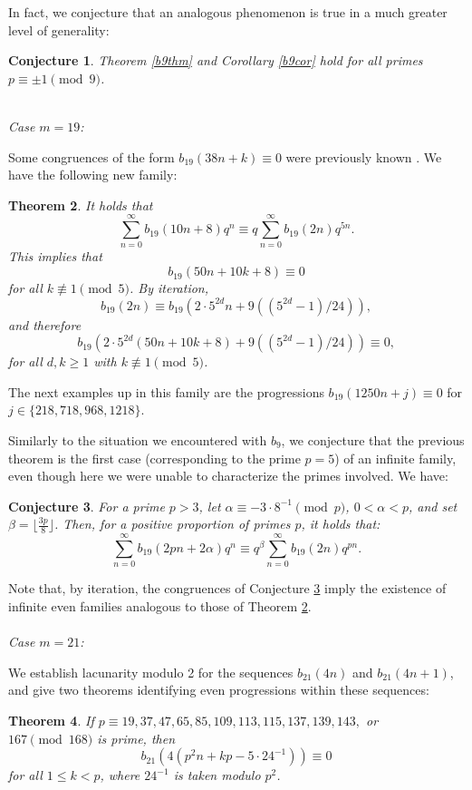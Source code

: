 \documentclass[12pt]{amsart}
\newtheorem{theorem}{Theorem}%
\newtheorem{conjecture}[theorem]{Conjecture}
\theoremstyle{definition}
\begin{document}
In fact, we conjecture that an analogous phenomenon is true in a much greater level of generality: 
\begin{conjecture}\label{b9conj} Theorem \ref{b9thm} and Corollary \ref{b9cor} hold for all primes $p \equiv \pm 1 \pmod{9}$.
\end{conjecture}
{\ }\\
\noindent \emph{Case $m=19$:}

Some congruences of the form $b_{19}(38n+k) \equiv 0 $ were previously known \cite{RaduSellers}.  We have the following new family: 
\begin{theorem}\label{b19thm} It holds that $$\sum_{n=0}^\infty b_{19}(10n+8) q^n \equiv q \sum_{n=0}^\infty b_{19}(2n)q^{5n}.$$  This implies that $$b_{19}(50n + 10k + 8) \equiv 0 $$
for all $k \not\equiv 1 \pmod{5}$.  By iteration, $$b_{19}(2n) \equiv b_{19}\left(2 \cdot 5^{2d} n + 9 ((5^{2d}-1)/24) \right),$$ and therefore $$b_{19} \left( 2 \cdot 5^{2d} (50n+10k+8) + 9 ( (5^{2d}-1)/24) \right) \equiv 0, $$ for all $d,k\ge 1$ with  $k \not\equiv 1 \pmod{5}$.
\end{theorem}

The next examples up in this family are the progressions $b_{19}(1250n + j) \equiv 0 $ for $j \in \{ 218, 718, 968, 1218 \}$.

Similarly to the situation we encountered with $b_9$, we conjecture that the previous theorem is the first case (corresponding to the prime $p=5$) of an infinite family, even though here we were unable to characterize the primes involved. We have:
\begin{conjecture}\label{b19conj} For a prime $p>3$, let $\alpha \equiv -3 \cdot 8^{-1} \pmod{p}$, $0 < \alpha < p$, and set $\beta = \lfloor \frac{3p}{8} \rfloor$.  Then, for a positive proportion of primes $p$, it holds that: $$\sum_{n=0}^\infty b_{19}(2pn + 2\alpha) q^n \equiv q^\beta \sum_{n=0}^\infty b_{19}(2n) q^{pn} .$$
\end{conjecture}

Note that, by iteration, the congruences of Conjecture \ref{b19conj} imply the existence of infinite even families analogous to those of Theorem \ref{b19thm}.\\
{\ }\\
\noindent \emph{Case $m = 21$:}

We establish lacunarity modulo 2 for the sequences $b_{21}(4n)$ and $b_{21}(4n+1)$, and give two theorems identifying even progressions within these sequences: 
\begin{theorem}\label{21in40} If $p \equiv 19, 37, 47, 65, 85, 109, 113, 115, 137, 139, 143,$ or $167 \pmod{168}$ is prime, then $$b_{21}(4(p^2 n + kp - 5 \cdot 24^{-1})) \equiv 0 $$ for all $1 \leq k < p$, where $24^{-1}$ is taken modulo $p^2$.
\end{theorem}
\end{document}
